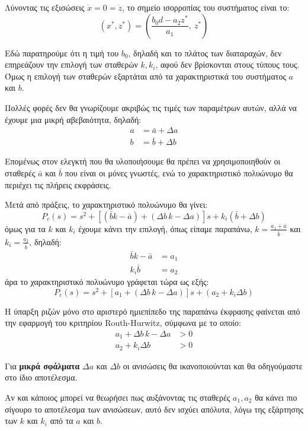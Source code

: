\documentclass[11pt,a4paper,notitlepage,fleqn]{article}
\begin{document}
\begin{exercise}
	Λύνοντας τις εξισώσεις \( \dot x = 0 = \dot z \), το σημείο
	ισορροπίας του συστήματος είναι το:
	\[
	(x^*,z^*) = \left(
	\frac{b_0 d - a_2z^*}{a_1},\ z^*
	\right)
	\]


	Εδώ παρατηρούμε ότι η τιμή του \( b_0 \), δηλαδή και το πλάτος των
	διαταραχών, δεν επηρεάζουν την επιλογή των σταθερών \( k,k_i \),
	αφού δεν βρίσκονται στους τύπους τους. Όμως η επιλογή των σταθερών
	εξαρτάται από τα χαρακτηριστικά του συστήματος \( a \) και \( b \).

	Πολλές φορές δεν θα γνωρίζουμε ακριβώς τις τιμές των παραμέτρων
	αυτών, αλλά να έχουμε μια μικρή αβεβαιότητα, δηλαδή:
	\begin{align*}
		a &= \bar a + Δa \\
		b &= \bar b + Δb
	\end{align*}

	Επομένως στον ελεγκτή που θα
	υλοποιήσουμε θα πρέπει να χρησιμοποιηθούν οι σταθερές
	\( \bar a \) και \( \bar b \) που είναι οι μόνες γνωστές, ενώ το
	χαρακτηριστικό πολυώνυμο θα περιέχει τις πλήρεις εκφράσεις.

	Μετά από πράξεις, το χαρακτηριστικό πολυώνυμο θα γίνει:
	\[
	P_c(s) = s^2 + \left[
	(\bar b k - \bar a) + (Δb\,k - Δa)
	\right]s + k_i(\bar b + Δb)
	\]
	όμως για τα \( k \) και \( k_i \) έχουμε κάνει την επιλογή,
	όπως είπαμε παραπάνω, \( k=\frac{a_1+\bar a}{\bar b} \) και
	\( k_i = \frac{a_2}{\bar b} \), δηλαδή:
	\begin{align*}
		\bar b k - \bar a &= a_1\\
		k_i \bar b &= a_2
	\end{align*}
	άρα το χαρακτηριστικό πολυώνυμο γράφεται τώρα ως εξής:
	\[
	P_c(s) = s^2 + \left[
	a_1 + (Δb\,k-Δa)
	\right]s + (a_2 + k_iΔb)
	\]

	Η ύπαρξη ριζών μόνο στο αριστερό ημιεπίπεδο της παραπάνω έκφρασης
	φαίνεται από την εφαρμογή του κριτηρίου Routh-Hurwitz, σύμφωνα
	με το οποίο:
	\begin{align*}
		a_1 + Δb\, k - Δa &> 0 \\
		a_2 + k_iΔb &>0
	\end{align*}

	Για \textbf{μικρά σφάλματα}
	\( Δa \) και \( Δb \) οι ανισώσεις θα ικανοποιούνται
	και θα οδηγούμαστε στο ίδιο αποτέλεσμα.

	Αν και κάποιος μπορεί να θεωρήσει πως αυξάνοντας τις σταθερές
	\( a_1,a_2 \) θα κάνει πιο σίγουρο το αποτέλεσμα των ανισώσεων,
	αυτό δεν ισχύει απόλυτα, λόγω της εξάρτησης των \( k \) και
	\( k_i \) από τα \( a \) και \( b \).
\end{exercise}
\end{document}
